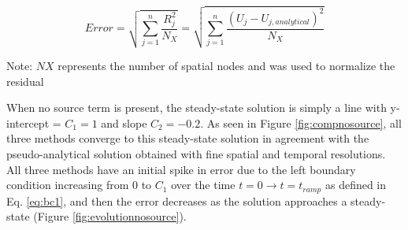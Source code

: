 \documentclass[10pt, letter, showtrims]{extarticle}
\begin{document}
		\begin{equation}
		\label{eq:L2Norm}
			Error = \sqrt{\sum_{j=1}^{n} \frac{R_{j}^{2}}{N_{X}}} = \sqrt{\sum_{j=1}^{n} \frac{(U_{j} - U_{j, analytical})^{2}}{N_{X}}}
		\end{equation}
		
		\noindent
		Note: $NX$ represents the number of spatial nodes and was used to normalize the residual
		
		\pagebreak
		
		\noindent
		When no source term is present, the steady-state solution is simply a line with y-intercept = $C_{1} = 1$ and slope $C_{2} = -0.2$. As seen in Figure \ref{fig:compnosource}, all three methods converge to this steady-state solution in agreement with the pseudo-analytical solution obtained with fine spatial and temporal resolutions. All three methods have an initial spike in error due to the left boundary condition increasing from $0$ to $C_{1}$ over the time $t = 0 \rightarrow t=t_{ramp}$ as defined in Eq. \ref{eq:bc1}, and then the error decreases as the solution approaches a steady-state (Figure \ref{fig:evolutionnosource}).
		
\end{document}
